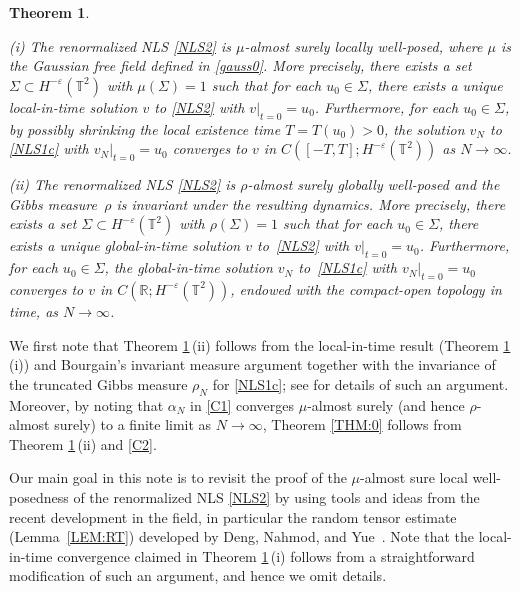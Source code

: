 \documentclass[%
11pt,  reqno]{amsart}
\newtheorem{theorem}{Theorem} [section]
\newcommand{\1}{\hspace{0.2mm}\text{I}\hspace{0.2mm}}
\newcommand{\noi}{\noindent}
\newcommand{\R}{\mathbb{R}}
\newcommand{\T}{\mathbb{T}}
\newcommand{\al}{\alpha}
\newcommand{\eps}{\varepsilon}
\newcommand{\Si}{\Sigma}
\numberwithin{equation}{section}
\numberwithin{theorem}{section}
\begin{document}
\begin{theorem}\label{THM:1}

\textup{(i)}
The renormalized NLS \eqref{NLS2}
is $\mu$-almost surely locally well-posed, 
where $\mu$ is the Gaussian free field defined
in \eqref{gauss0}.
More precisely,  there exists a set
 $\Si \subset H^{-\eps}(\T^2)$
with $\mu(\Si) = 1$ such that 
for each $u_0 \in \Si$, 
there exists a unique local-in-time solution $v$ to \eqref{NLS2}
with $v|_{t = 0} = u_0$.
Furthermore, 
for each $u_0 \in \Si$, 
by possibly shrinking the local existence time $T = T(u_0) > 0$, 
the solution $v_N$ to \eqref{NLS1c}
with $v_N|_{t = 0} = u_0$ 
converges to $v$
in $C([-T, T];  H^{-\eps}(\T^2))$
as $N \to \infty$.


\smallskip


\noi
\textup{(ii)}
The renormalized NLS \eqref{NLS2}
is $\rho$-almost surely globally  well-posed
and the Gibbs measure~$\rho$ is invariant under the resulting dynamics.
More precisely,  there exists a set
 $\Si \subset H^{-\eps}(\T^2)$
with $\rho(\Si) = 1$ such that 
for each $u_0 \in \Si$, 
there exists a unique global-in-time solution $v$ to~\eqref{NLS2}
with $v|_{t = 0} = u_0$.
Furthermore, 
for each $u_0 \in \Si$, 
the global-in-time solution $v_N$ to~\eqref{NLS1c}
with $v_N|_{t = 0} = u_0$ 
converges to $v$
in $C(\R;  H^{-\eps}(\T^2))$, 
endowed with the compact-open
topology in time, 
as $N \to \infty$.


\end{theorem}


We first note that
 Theorem \ref{THM:1}\,(ii)
follows 
from
 the local-in-time result (Theorem \ref{THM:1}\,(i))
 and Bourgain's invariant measure argument \cite{BO94, BO96}
 together with the invariance of the truncated Gibbs measure
 $\rho_N$ for \eqref{NLS1c};
 see 
\cite{BT2, ORTz}
for details of such an argument. 
Moreover, 
by noting that $\al_N$ in \eqref{C1}
converges $\mu$-almost surely  (and hence $\rho$-almost surely) 
to a finite limit as $N \to \infty$, 
Theorem \ref{THM:0} follows
from 
 Theorem \ref{THM:1}\,(ii) and \eqref{C2}.


\medskip

Our main goal in this note
is to revisit the proof of 
the $\mu$-almost sure local well-posedness of the renormalized NLS \eqref{NLS2}
by using 
tools and ideas 
from the recent development in the field, 
in particular 
the random
tensor estimate (Lemma~\ref{LEM:RT}) developed
by Deng, Nahmod, and Yue~\cite{DNY3}.
Note that  the local-in-time convergence claimed in Theorem \ref{THM:1}\,(i) follows from 
a straightforward modification
of such an argument, 
and hence we omit details.
\end{document}

